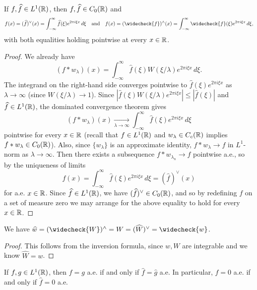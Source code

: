 \begin{theorem}
  If $f, \widehat{f} \in L^1(\mathbb{R})$, then
  $f, \widehat{f} \in C_0(\mathbb{R})$ and
  \[
    f(x) = (\widehat{f})^\vee(x) = \int_{-\infty}^\infty \widehat{f}(\xi) e^{2\pi i \xi x}\, d\xi
    \quad \text{and} \quad
    f(x) = (\widecheck{f})^\wedge(x)
    = \int_{-\infty}^\infty \widecheck{f}(\xi) e^{2\pi i \xi x}\, d\xi,
  \]
  with both equalities holding pointwise at
  every $x \in \mathbb{R}$.
\end{theorem}

\begin{proof}
  We already have
  \[
    (f * w_\lambda)(x)
    = \int_{-\infty}^\infty \widehat{f}(\xi) W(\xi / \lambda) e^{2\pi i \xi x}\, d\xi.
  \]
  The integrand on the right-hand side
  converges pointwise
  to $\widehat{f}(\xi) e^{2\pi i \xi x}$
  as $\lambda \to \infty$
  (since $W(\xi / \lambda) \to 1$).
  Since
  $|\widehat{f}(\xi) W(\xi / \lambda) e^{2\pi i \xi x}| \le |\widehat{f}(\xi)|$
  and $\widehat{f} \in L^1(\mathbb{R})$,
  the dominated convergence theorem gives
  \pagebreak
  \[
    (f * w_\lambda)(x)
    \xrightarrow[\lambda \to \infty]{}
    \int_{-\infty}^\infty \widehat{f}(\xi) e^{2\pi i \xi x}\, d\xi
  \]
  pointwise for every $x \in \mathbb{R}$ (recall that
  $f \in L^1(\mathbb{R})$ and $w_\lambda \in C_c(\mathbb{R})$ implies
  $f * w_\lambda \in C_0(\mathbb{R})$). Also, since
  $\{w_\lambda\}$ is an approximate identity,
  $f * w_\lambda \to f$ in $L^1$-norm as
  $\lambda \to \infty$. Then there exists a
  subsequence $f * w_{\lambda_n} \to f$ pointwise
  a.e., so by the uniqueness of limits
  \[
    f(x) = \int_{-\infty}^\infty \widehat{f}(\xi) e^{2\pi i \xi x}\, d\xi
    = (\widehat{f})^\vee(x)
  \]
  for a.e. $x \in \mathbb{R}$. Since $\widehat{f} \in L^1(\mathbb{R})$,
  we have
  $(\widehat{f})^\vee \in C_0(\mathbb{R})$, and so by
  redefining $f$ on a set of measure zero
  we may arrange for the above equality to hold for every
  $x \in \mathbb{R}$.
\end{proof}

\begin{corollary}
  We have
  $\widehat{w} = (\widecheck{W})^\wedge = W = (\widehat{W})^\vee = \widecheck{w}$.
\end{corollary}

\begin{proof}
  This follows from the inversion formula,
  since $w, W$ are integrable and
  we know $\widehat{W} = w$.
\end{proof}

\begin{corollary}\label{cor:uniqueness}
  If $f, g \in L^1(\mathbb{R})$, then
  $f = g$ a.e. if and only if $\widehat{f} = \widehat{g}$
  a.e. In particular,
  $f = 0$ a.e. if and only if $\widehat{f} = 0$ a.e.
\end{corollary}

